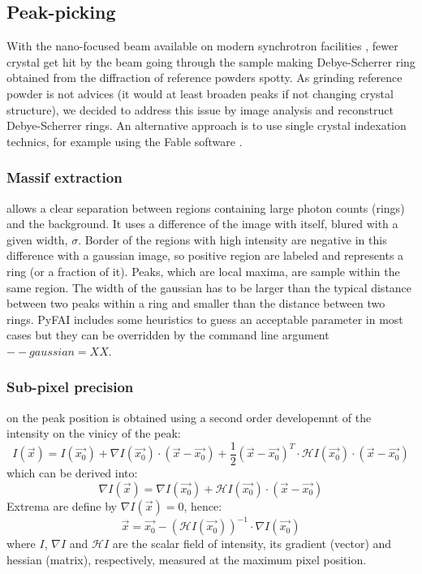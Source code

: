 \documentclass[preprint]{iucr}
\begin{document}
\subsection{Peak-picking}
With the nano-focused beam available on modern synchrotron facilities
\cite{id13}, fewer crystal get hit by the beam going through the
sample making Debye-Scherrer ring obtained from the diffraction of reference
powders spotty.
As grinding reference powder is not advices (it would at least broaden peaks if
not changing crystal structure), we decided to address this issue by image analysis 
and reconstruct Debye-Scherrer rings.
An alternative approach is to use single crystal indexation technics, for
example using the Fable software \cite{bonnin}.

\subsubsection{Massif extraction}
\label{massif}
allows a clear separation between regions containing large
photon counts (rings) and the background.
It uses a difference of the image with itself, blured with a given width,
$\sigma$. 
Border of the regions with high intensity are negative in this
difference with a gaussian image, so positive region are labeled and represents
a ring (or a fraction of it). Peaks, which are local maxima, are sample within
the same region.
The width of the gaussian has to be larger than the typical distance
between two peaks within a ring and smaller than the distance between two
rings. 
PyFAI includes some heuristics to guess an acceptable parameter in most cases
but they can be overridden by the command line argument $--gaussian=XX$.

\subsubsection{Sub-pixel precision} 
\label{subpixel}
on the peak position is obtained using a second order developemnt of the
intensity on the vinicy of the peak:
$$ I(\overrightarrow{x}) = I(\overrightarrow{x_0}) + \nabla
I(\overrightarrow{x_0})\cdot (\overrightarrow{x}-\overrightarrow{x_0}) +
\frac{1}{2} (\overrightarrow{x}-\overrightarrow{x_0})^T\cdot\mathcal{H}
I(\overrightarrow{x_0})\cdot(\overrightarrow{x}-\overrightarrow{x_0})$$ which
can be derived into:
$$\nabla I(\overrightarrow{x}) =\nabla I(\overrightarrow{x_0}) +
\mathcal{H}I(\overrightarrow{x_0})\cdot(\overrightarrow{x}-\overrightarrow{x_0})$$
Extrema are define by $\nabla I(\overrightarrow{x})=0$, hence:
$$\overrightarrow{x} = \overrightarrow{x_0} - (\mathcal{H}
I(\overrightarrow{x_0}))^{-1}\cdot\nabla I(\overrightarrow{x_0})$$ where $I$,
$\nabla I$ and $\mathcal{H} I$ are the scalar field of intensity, its gradient
(vector) and hessian (matrix), respectively, measured at the maximum pixel position.
\end{document}
